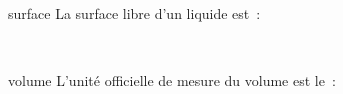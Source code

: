\documentclass[a4paper]{article}
\begin{document}
{\begin{multicols}{2}
\begin{question}{surface}
	La surface libre d'un liquide est~:
	\begin{reponses}
	\end{reponses}   
	  
\end{question}


\begin{question}{volume}
	L'unité officielle de mesure du volume est le~:
	\begin{reponses}
	\end{reponses}   
	
\end{question}


\end{multicols} 

\clearpage    


}  
\end{document}
